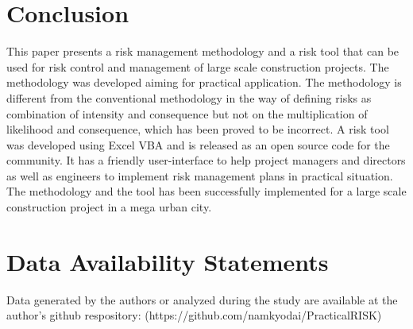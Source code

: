 \documentclass[10pt,halfline,a4paper]{ouparticle}
\begin{document}
\section{Conclusion}
\label{sec6}
This paper presents a risk management methodology and a risk tool that can be used for risk control and management of large scale construction projects. The methodology was developed aiming for practical application. The methodology is different from the conventional methodology in the way of defining risks as combination of intensity and consequence but not on the multiplication of likelihood and consequence, which has been proved to be incorrect. A risk tool was developed using Excel VBA and is released as an open source code for the community. It has a friendly user-interface to help project managers and directors as well as engineers to implement risk management plans in practical situation. The methodology and the tool has been successfully implemented for a large scale construction project in a mega urban city.  



\section{Data Availability Statements}
Data generated by the authors or analyzed during the study are available at the author's github respository:  (https://github.com/namkyodai/PracticalRISK)


\end{document}
